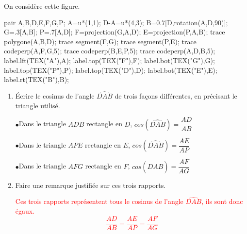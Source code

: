     On considère cette figure.

    \begin{center}
        \begin{Geometrie}
            pair A,B,D,E,F,G,P;
            A=u*(1,1);
            D-A=u*(4,3);
            B=0.7[D,rotation(A,D,90)];
            G=.3[A,B];
            P=.7[A,D];
            F=projection(G,A,D);
            E=projection(P,A,B);
            trace polygone(A,B,D);
            trace segment(F,G);
            trace segment(P,E);
            trace codeperp(A,F,G,5);
            trace codeperp(B,E,P,5);
            trace codeperp(A,D,B,5);
            label.lft(TEX("A"),A);
            label.top(TEX("F"),F);
            label.bot(TEX("G"),G);
            label.top(TEX("P"),P);
            label.top(TEX("D"),D);
            label.bot(TEX("E"),E);
            label.rt(TEX("B"),B);
        \end{Geometrie}
    \end{center}
    \begin{enumerate}
        \item Écrire le cosinus de l'angle $\widehat{DAB}$ de trois façons différentes, en précisant le triangle utilisé.

        {\color{red}
        \begin{itemize}
            \def\item{$\bullet$}
            \item Dans le triangle $ADB$ rectangle en $D$, $cos(\widehat{DAB})=\dfrac{AD}{AB}$

            \item Dans le triangle $APE$ rectangle en $E$, $cos(\widehat{DAB})=\dfrac{AE}{AP}$

            \item Dans le triangle $AFG$ rectangle en $F$, $cos(\widehat{DAB})=\dfrac{AF}{AG}$
        \end{itemize}
        }
        \item Faire une remarque justifiée sur ces trois rapports.

        \textcolor{red}{Ces trois rapports représentent tous le cosinus de l'angle $\widehat{DAB}$, ils sont donc égaux. $$\dfrac{AD}{AB}=\dfrac{AE}{AP}=\dfrac{AF}{AG}$$}
    \end{enumerate}
